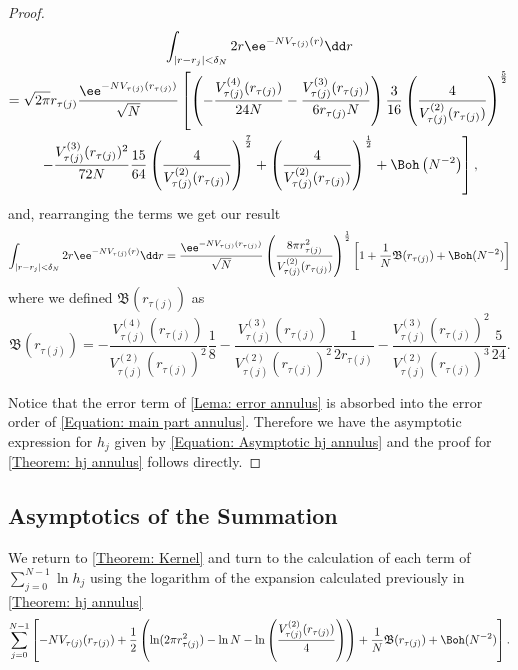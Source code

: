 \begin{proof}
	\begin{multline}
		\int_{|r - r_j| < \delta_N} 2r \ee^{-N V_{\tau(j)}(r)} \dd r\\ 
		 = \sqrt{2\pi} r_{\tau(j)} \frac{\ee^{-N V_{\tau(j)}(r_{\tau(j)})}}{\sqrt{N}} \left[
		\left(- \frac{V^{(4)}_{\tau(j)}(r_{\tau(j)})}{24 N} - \frac{V^{(3)}_{\tau(j)}(r_{\tau(j)})}{6 r_{\tau(j)} N} \right) \frac{3}{16} \left( \frac{4}{V^{(2)}_{\tau(j)}(r_{\tau(j)})} \right)^{\frac{5}{2}} \right. \\
		\left. - \frac{V^{(3)}_{\tau(j)}(r_{\tau(j)})^2}{72 N} \frac{15}{64} \left(\frac{4}{V^{(2)}_{\tau(j)}(r_{\tau(j)})} \right)^{\frac{7}{2}} +
		\left( \frac{4}{V^{(2)}_{\tau(j)}(r_{\tau(j)})} \right)^{\frac{1}{2}} + \Boh\left( N^{-2} \right) \right],
	\end{multline}
	and, rearranging the terms we get our result
	\begin{equation}
		\int_{|r - r_j| < \delta_N} 2r \ee^{-N V_{\tau(j)}(r)} \dd r =  \frac{\ee^{-N V_{\tau(j)}(r_{\tau(j)})}}{\sqrt{N}} \left( \frac{8\pi r_{\tau(j)}^2}{V^{(2)}_{\tau(j)}(r_{\tau(j)})} \right)^{\frac{1}{2}} \left[ 1 + \frac{1}{N} \mathfrak{B}(r_{\tau(j)}) + \Boh(N^{-2}) \right]
		\label{Equation: main part annulus}
	\end{equation}
	where we defined $	\mathfrak{B}(r_{\tau(j)})$ as
	\begin{equation}
		\mathfrak{B}(r_{\tau(j)}) = -\frac{V^{(4)}_{\tau(j)}(r_{\tau(j)})}{V^{(2)}_{\tau(j)}(r_{\tau(j)})^2} \frac{1}{8} - \frac{V^{(3)}_{\tau(j)}(r_{\tau(j)})}{V^{(2)}_{\tau(j)}(r_{\tau(j)})^{2}} \frac{1}{2 r_{\tau(j)}} - \frac{V^{(3)}_{\tau(j)}(r_{\tau(j)})^2}{V^{(2)}_{\tau(j)}(r_{\tau(j)})^{3}} \frac{5}{24}.
	\end{equation}
	
	Notice that the error term of \autoref{Lema: error annulus} is absorbed into the error order of \eqref{Equation: main part annulus}. Therefore we have the asymptotic expression for $h_j$ given by \eqref{Equation: Asymptotic hj annulus} and the proof for \autoref{Theorem: hj annulus} follows directly.
\end{proof}

\subsection{Asymptotics of the Summation}

We return to \autoref{Theorem: Kernel} and turn to the calculation of each term of $	\sum_{j=0}^{N-1} \ln{h_j}$ using the logarithm of the expansion calculated previously in \autoref{Theorem: hj annulus}
\begin{equation}
 \sum_{j=0}^{N-1} \left[-N V_{\tau(j)}(r_{\tau(j)}) + \frac{1}{2} \left(\ln(2\pi r^2_{\tau(j)}) - \ln N - \ln\left(\frac{V^{(2)}_{\tau(j)}(r_{\tau(j)})}{4}\right)  \right) + \frac{1}{N} \mathfrak{B}(r_{\tau(j)}) + \Boh(N^{-2})\right]. 
	\label{Equation: sum log annulus}
\end{equation}

